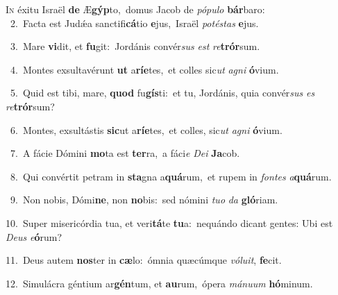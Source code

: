 \lettrine{\initial\textcolor{\initialcolor}{I}}{n} éxitu Israël \textbf{de} Æ\-\textbf{gýp}\-to,~\star domus Jacob de \textit{pó}\-\textit{pu}\textit{lo} \textbf{bár}\-baro:\\
{\numbfont\textcolor{\numbcolor}{~2.}}~Facta est Judǽa sanctifi\-\textbf{cá}\-tio \textbf{e}\-jus,~\star Israël \textit{pot}\-\textit{és}\textit{tas} \textbf{e}\-jus.\par
{\numbfont\textcolor{\numbcolor}{~3.}}~Mare \textbf{vi}\-dit, et \textbf{fu}\-git:~\star Jordánis convér\textit{sus} \textit{est} \textit{re}\-\textbf{trór}sum.\par
{\numbfont\textcolor{\numbcolor}{~4.}}~Montes exsultavérunt \textbf{ut} a\-\textbf{rí}\-\textbf{e}tes,~\star et colles sic\textit{ut} \textit{a}\-\textit{gni} \textbf{ó}\-vium.\par
{\numbfont\textcolor{\numbcolor}{~5.}}~Quid est tibi, mare, \textbf{quod} fu\-\textbf{gís}\-ti:~\star et tu, Jordánis, quia convér\textit{sus} \textit{es} \textit{re}\-\textbf{trór}sum?\par
{\numbfont\textcolor{\numbcolor}{~6.}}~Montes, exsultástis \textbf{sic}\-ut a\-\textbf{rí}\-\textbf{e}tes,~\star et colles, sic\textit{ut} \textit{a}\-\textit{gni} \textbf{ó}\-vium.\par
{\numbfont\textcolor{\numbcolor}{~7.}}~A fácie Dómini \textbf{mo}\-ta est \textbf{ter}\-ra,~\star a fáci\textit{e} \textit{De}\-\textit{i} \textbf{Ja}\-cob.\par
{\numbfont\textcolor{\numbcolor}{~8.}}~Qui convértit petram in \textbf{sta}\-gna a\-\textbf{quá}\-rum,~\star et rupem in \textit{fon}\-\textit{tes} \textit{a}\-\textbf{quá}rum.\par
{\numbfont\textcolor{\numbcolor}{~9.}}~Non nobis, Dómi\-\textbf{ne}\-, non \textbf{no}\-bis:~\star sed nómini \textit{tu}\-\textit{o} \textit{da} \textbf{gló}\-riam.\par
{\numbfont\textcolor{\numbcolor}{10.}}~Super misericórdia tua, et veri\-\textbf{tá}\-te \textbf{tu}\-a:~\star nequándo dicant gentes: Ubi est \textit{De}\-\textit{us} \textit{e}\-\textbf{ó}rum?\par
{\numbfont\textcolor{\numbcolor}{11.}}~Deus autem \textbf{nos}\-ter in \textbf{cæ}\-lo:~\star ómnia quæcúmque \textit{vó}\-\textit{lu}\textit{it}, \textbf{fe}\-cit.\par
{\numbfont\textcolor{\numbcolor}{12.}}~Simulácra géntium ar\-\textbf{gén}\-tum, et \textbf{au}\-rum,~\star ópera \textit{má}\-\textit{nu}\textit{um} \textbf{hó}\-minum.\par

